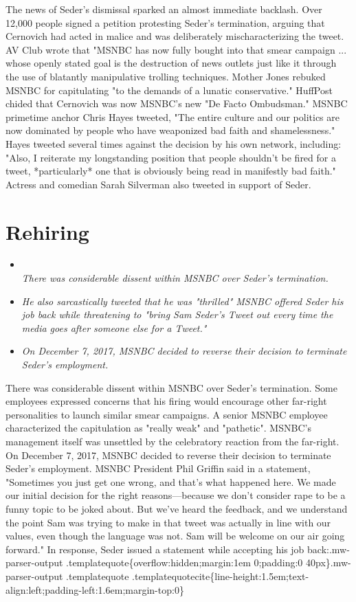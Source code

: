 The news of Seder's dismissal sparked an almost immediate backlash. Over
12,000 people signed a petition protesting Seder's termination, arguing
that Cernovich had acted in malice and was deliberately
mischaracterizing the tweet. AV Club wrote that "MSNBC has now fully
bought into that smear campaign ... whose openly stated goal is the
destruction of news outlets just like it through the use of blatantly
manipulative trolling techniques. Mother Jones rebuked MSNBC for
capitulating "to the demands of a lunatic conservative." HuffPost chided
that Cernovich was now MSNBC's new "De Facto Ombudsman." MSNBC primetime
anchor Chris Hayes tweeted, "The entire culture and our politics are now
dominated by people who have weaponized bad faith and shamelessness."
Hayes tweeted several times against the decision by his own network,
including: "Also, I reiterate my longstanding position that people
shouldn't be fired for a tweet, *particularly* one that is obviously
being read in manifestly bad faith." Actress and comedian Sarah
Silverman also tweeted in support of Seder.

\section{Rehiring}\label{rehiring}

\begin{itemize}
\item
  \emph{\\
  There was considerable dissent within MSNBC over Seder's termination.}
\item
  \emph{He also sarcastically tweeted that he was "thrilled" MSNBC
  offered Seder his job back while threatening to "bring Sam Seder's
  Tweet out every time the media goes after someone else for a Tweet."}
\item
  \emph{On December 7, 2017, MSNBC decided to reverse their decision to
  terminate Seder's employment.}
\end{itemize}

There was considerable dissent within MSNBC over Seder's termination.
Some employees expressed concerns that his firing would encourage other
far-right personalities to launch similar smear campaigns. A senior
MSNBC employee characterized the capitulation as "really weak" and
"pathetic". MSNBC's management itself was unsettled by the celebratory
reaction from the far-right. On December 7, 2017, MSNBC decided to
reverse their decision to terminate Seder's employment. MSNBC President
Phil Griffin said in a statement, "Sometimes you just get one wrong, and
that's what happened here. We made our initial decision for the right
reasons---because we don't consider rape to be a funny topic to be joked
about. But we've heard the feedback, and we understand the point Sam was
trying to make in that tweet was actually in line with our values, even
though the language was not. Sam will be welcome on our air going
forward." In response, Seder issued a statement while accepting his job
back:.mw-parser-output .templatequote\{overflow:hidden;margin:1em
0;padding:0 40px\}.mw-parser-output .templatequote
.templatequotecite\{line-height:1.5em;text-align:left;padding-left:1.6em;margin-top:0\}

